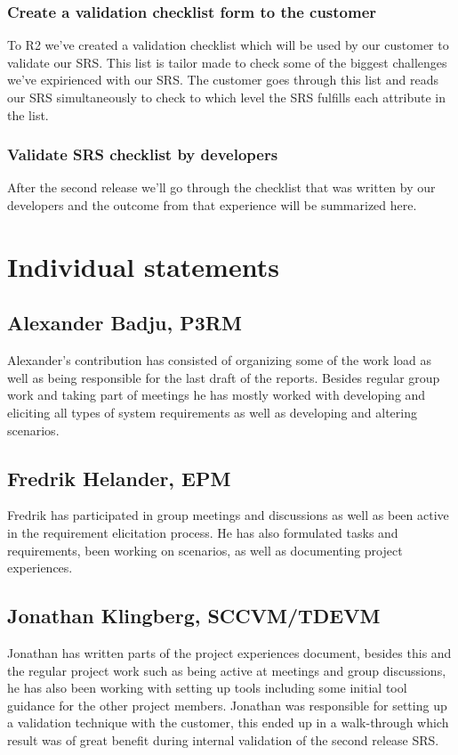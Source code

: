 \documentclass[10pt]{article}
\begin{document}
\subsubsection{Create a validation checklist form to the customer}
To R2 we've created a validation checklist which will be used by our customer to validate our SRS. This list is tailor made to check some of the biggest challenges we've expirienced with our SRS. The customer goes through this list and reads our SRS simultaneously to check to which level the SRS fulfills each attribute in the list.

\subsubsection{Validate SRS checklist by developers}
After the second release we'll go through the checklist that was written by our developers and the outcome from that experience will be summarized here.

\section{Individual statements}
\noindent
\subsection{Alexander Badju, P3RM}
Alexander's contribution has consisted of organizing some of the work load as well as being responsible for the last draft of the reports. Besides regular group work and taking part of meetings he has mostly worked with developing and eliciting all types of system requirements as well as developing and altering scenarios. 
\subsection{Fredrik Helander, EPM}
Fredrik has participated in group meetings and discussions as well as been active in the requirement elicitation process. He has also formulated tasks and requirements, been working on scenarios, as well as documenting project experiences.
\subsection{Jonathan Klingberg, SCCVM/TDEVM}
Jonathan has written parts of the project experiences document, besides this and the regular project work such as being active at meetings and group discussions, he has also been working with setting up tools including some initial tool guidance for the other project members.
Jonathan was responsible for setting up a validation technique with the customer, this ended up in a walk-through which result was of great benefit during internal validation of the second release SRS.
\end{document}
